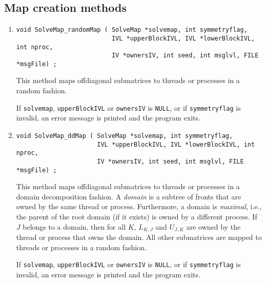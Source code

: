 \subsection{Map creation methods}
\label{subsection:SolveMap:proto:maps}
\par
\begin{enumerate}
\item
\begin{verbatim}
void SolveMap_randomMap ( SolveMap *solvemap, int symmetryflag, 
                          IVL *upperBlockIVL, IVL *lowerBlockIVL, int nproc, 
                          IV *ownersIV, int seed, int msglvl, FILE *msgFile) ;
\end{verbatim}
This method maps offdiagonal submatrices 
to threads or processes in a random fashion.
\par {}
If {\tt solvemap}, {\tt upperBlockIVL} or {\tt ownersIV} is {\tt NULL}, 
or if {\tt symmetryflag} is invalid,
an error message is printed and the program exits.
\item
\begin{verbatim}
void SolveMap_ddMap ( SolveMap *solvemap, int symmetryflag, 
                      IVL *upperBlockIVL, IVL *lowerBlockIVL, int nproc,
                      IV *ownersIV, int seed, int msglvl, FILE *msgFile) ;
\end{verbatim}
This method maps offdiagonal submatrices 
to threads or processes in a domain decomposition fashion.
A {\it domain} is a subtree of fronts that are owned by the same
thread or process.
Furthermore, a domain is {\it maximal}, i.e., the parent of the
root domain (if it exists) is owned by a different process.
If $J$ belongs to a domain, then for all $K$, 
$L_{K,J}$ and $U_{J,K}$ are owned
by the thread or process that owns the domain.
All other submatrices are mapped to threads or processes in a
random fashion.
\par {}
If {\tt solvemap}, {\tt upperBlockIVL} or {\tt ownersIV} is {\tt NULL}, 
or if {\tt symmetryflag} is invalid,
an error message is printed and the program exits.
\end{enumerate}
\par
